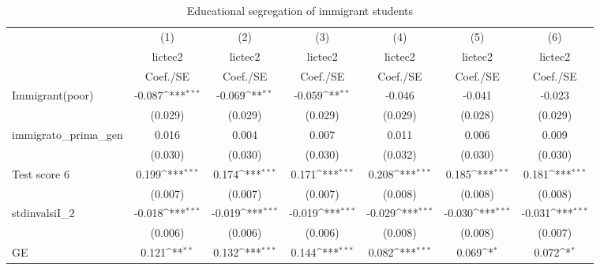 \begin{table}[htbp]\centering
\def\sym#1{\ifmmode^{#1}\else\(^{#1}\)\fi}
\caption{Educational segregation of immigrant students \label{TableA1}}
\begin{tabular}{l*{6}{c}}
\toprule
                    &\multicolumn{1}{c}{(1)}&\multicolumn{1}{c}{(2)}&\multicolumn{1}{c}{(3)}&\multicolumn{1}{c}{(4)}&\multicolumn{1}{c}{(5)}&\multicolumn{1}{c}{(6)}\\
                    &\multicolumn{1}{c}{lictec2}&\multicolumn{1}{c}{lictec2}&\multicolumn{1}{c}{lictec2}&\multicolumn{1}{c}{lictec2}&\multicolumn{1}{c}{lictec2}&\multicolumn{1}{c}{lictec2}\\
                    &    Coef./SE         &    Coef./SE         &    Coef./SE         &    Coef./SE         &    Coef./SE         &    Coef./SE         \\
\midrule
Immigrant(poor)     &      -0.087\sym{***}&      -0.069\sym{**} &      -0.059\sym{**} &      -0.046         &      -0.041         &      -0.023         \\
                    &     (0.029)         &     (0.029)         &     (0.029)         &     (0.029)         &     (0.028)         &     (0.029)         \\
immigrato\_prima\_gen &       0.016         &       0.004         &       0.007         &       0.011         &       0.006         &       0.009         \\
                    &     (0.030)         &     (0.030)         &     (0.030)         &     (0.032)         &     (0.030)         &     (0.030)         \\
Test score 6        &       0.199\sym{***}&       0.174\sym{***}&       0.171\sym{***}&       0.208\sym{***}&       0.185\sym{***}&       0.181\sym{***}\\
                    &     (0.007)         &     (0.007)         &     (0.007)         &     (0.008)         &     (0.008)         &     (0.008)         \\
stdinvalsiI\_2       &      -0.018\sym{***}&      -0.019\sym{***}&      -0.019\sym{***}&      -0.029\sym{***}&      -0.030\sym{***}&      -0.031\sym{***}\\
                    &     (0.006)         &     (0.006)         &     (0.006)         &     (0.008)         &     (0.008)         &     (0.007)         \\
GE                  &       0.121\sym{**} &       0.132\sym{***}&       0.144\sym{***}&       0.082\sym{***}&       0.069\sym{*}  &       0.072\sym{*}  \\

\end{tabular}
\end{table}
